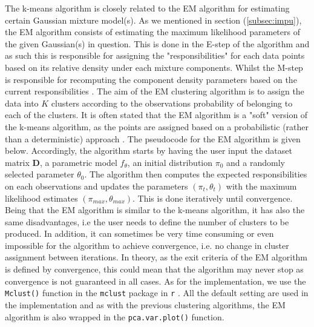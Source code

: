 \documentclass[../thesis.tex]{subfiles}
\begin{document}
\noindent The k-means algorithm is closely related to the EM algorithm \citep{dempster1977maximum} for estimating certain Gaussian mixture model(s). As we mentioned in section (\ref{subsec:impu}), the EM algorithm consists of estimating the maximum likelihood parameters of the given Gaussian(s) in question. This is done in the E-step of the algorithm and as such this is responsible for assigning the "responsibilities" for each data points based on its relative density under each mixture components. Whilst the M-step is responsible for recomputing the component density parameters based on the current responsibilities \citep{friedman2009elements}. The aim of the EM clustering algorithm is to assign the data into $K$ clusters according to the observations probability of belonging to each of the clusters. It is often stated that the EM algorithm is a "soft" version of the k-means algorithm, as the points are assigned based on a probabilistic (rather than a deterministic) approach \citep{james2013introduction}. The pseudocode for the EM algorithm is given below. Accordingly, the algorithm starts by having the user input the dataset matrix $\mathbf{D}$, a parametric model $f_\theta$, an initial distribution $\pi_0$ and a randomly selected parameter $\theta_0$. The algorithm then computes the expected responsibilities on each observations and updates the parameters $(\pi_t, \theta_t)$ with the maximum likelihood estimates $(\pi_{max}, \theta_{max})$. This is done iteratively until convergence. Being that the EM algorithm is similar to the k-means algorithm, it has also the same disadvantages, i.e the user needs to define the number of clusters to be produced. In addition, it can sometimes be very time consuming or even impossible for the algorithm to achieve convergence, i.e. no change in cluster assignment between iterations. In theory, as the exit criteria of the EM algorithm is defined by convergence, this could mean that the algorithm may never stop as convergence is not guaranteed in all cases.  As for the implementation, we use the \texttt{Mclust()} function in the \texttt{mclust} package in \texttt{r} \citep{mclust}. All the default setting are used in the implementation and as with the previous clustering algorithms, the EM algorithm is also wrapped in the \texttt{pca.var.plot()} function.\\
\end{document}
